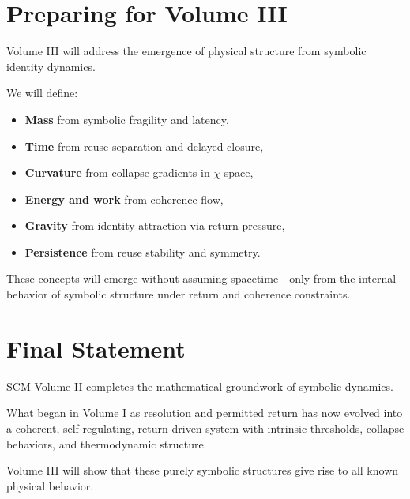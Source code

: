 \section{Preparing for Volume III} \label{preparing-for-volume-iii}

Volume III will address the emergence of physical structure from symbolic identity dynamics.

\medskip

We will define:
\begin{itemize}
    \item \textbf{Mass} from symbolic fragility and latency,
    \item \textbf{Time} from reuse separation and delayed closure,
    \item \textbf{Curvature} from collapse gradients in $\chi$-space,
    \item \textbf{Energy and work} from coherence flow,
    \item \textbf{Gravity} from identity attraction via return pressure,
    \item \textbf{Persistence} from reuse stability and symmetry.
\end{itemize}

\medskip

These concepts will emerge without assuming spacetime—only from the internal behavior of symbolic structure under return and coherence constraints.

\section{Final Statement} \label{final-statement}

\noindent
SCM Volume II completes the mathematical groundwork of symbolic dynamics.

\medskip

What began in Volume I as resolution and permitted return has now evolved into a coherent, self-regulating, return-driven system with intrinsic thresholds, collapse behaviors, and thermodynamic structure.

\medskip

Volume III will show that these purely symbolic structures give rise to all known physical behavior.
